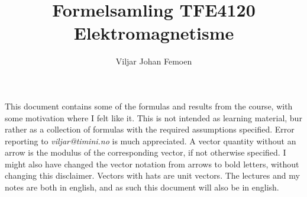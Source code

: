 \documentclass[a4paper, 12pt]{article}
\title{Formelsamling TFE4120 Elektromagnetisme}
\begin{document}
\author{Viljar Johan Femoen} %

\flushbottom
\maketitle
\thispagestyle{empty}
\vskip 20pt
\vskip 2pt
\noindent This document contains some of the formulas and results from the course, with some motivation where I felt like it. 
This is not intended as learning material, bur rather as a collection of formulas with the required assumptions specified. 
Error reporting to \textit{viljar@timini.no} is much appreciated. 
A vector quantity without an arrow is the modulus of the corresponding vector, if not otherwise specified. 
I might also have changed the vector notation from arrows to bold letters, without changing this disclaimer. 
Vectors with hats are unit vectors.
The lectures and my notes are both in english, and as such this document will also be in english.

\tableofcontents
\end{document}
